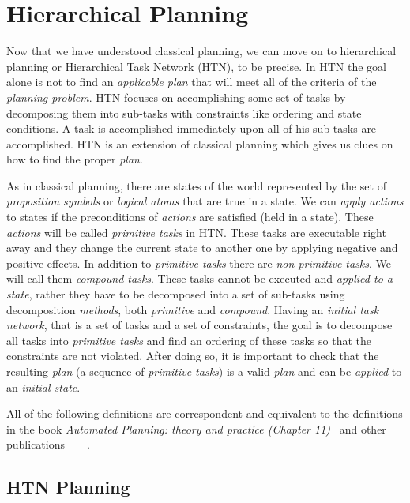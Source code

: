 \chapter{Hierarchical {P}lanning}

\medskip\noindent
Now that we have understood classical planning, we can move on to hierarchical planning or Hierarchical Task Network (HTN), to be precise. In HTN the goal alone is not to find an \emph{applicable plan} that will meet all of the criteria of the \emph{planning problem}. HTN focuses on accomplishing some set of tasks by decomposing them into sub-tasks with constraints like ordering and state conditions. A task is accomplished immediately upon all of his sub-tasks are accomplished. HTN is an extension of classical planning which gives us clues on how to find the proper \emph{plan}.

\medskip\noindent
As in classical planning, there are states of the world represented by the set of \emph{proposition symbols} or \emph{logical atoms} that are true in a state. We can \emph{apply actions} to states if the preconditions of \emph{actions} are satisfied (held in a state). These \emph{actions} will be called \emph{primitive tasks} in HTN. These tasks are executable right away and they change the current state to another one by applying negative and positive effects. In addition to \emph{primitive tasks} there are \emph{non-primitive tasks}. We will call them \emph{compound tasks}. These tasks cannot be executed and \emph{applied to a state}, rather they have to be decomposed into a set of sub-tasks using decomposition \emph{methods}, both \emph{primitive} and \emph{compound}. Having an \emph{initial task network}, that is a set of tasks and a set of constraints, the goal is to decompose all tasks into \emph{primitive tasks} and find an ordering of these tasks so that the constraints are not violated. After doing so, it is important to check that the resulting \emph{plan} (a sequence of \emph{primitive tasks}) is a valid \emph{plan} and can be \emph{applied} to an \emph{initial state}.

\medskip\noindent
All of the following definitions are correspondent and equivalent to the definitions in the book \emph{Automated Planning: theory and practice (Chapter 11)}~\cite{nau} and other publications~\cite{langclassification}~\cite{cmyk}~\cite{ondrckova2023semantics}~\cite{ondrckova2024empty}.

\section{HTN Planning}


